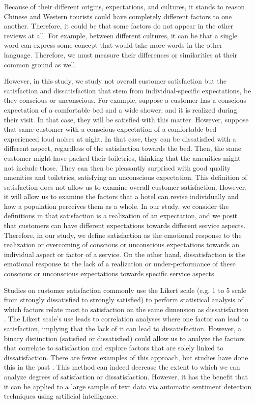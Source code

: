 \documentclass[smallextended,natbib]{svjour3}       %
\begin{document}
    Because of their different origins, expectations, and cultures, it stands to reason Chinese and Western tourists could have completely different factors to one another. Therefore, it could be that some factors do not appear in the other reviews at all. For example, between different cultures, it can be that a single word can express some concept that would take more words in the other language. Therefore, we must measure their differences or similarities at their common ground as well.

    However, in this study, we study not overall customer satisfaction but the satisfaction and dissatisfaction that stem from individual-specific expectations, be they conscious or unconscious. For example, suppose a customer has a conscious expectation of a comfortable bed and a wide shower, and it is realized during their visit. In that case, they will be satisfied with this matter. However, suppose that same customer with a conscious expectation of a comfortable bed experienced loud noises at night. In that case, they can be dissatisfied with a different aspect, regardless of the satisfaction towards the bed. Then, the same customer might have packed their toiletries, thinking that the amenities might not include those. They can then be pleasantly surprised with good quality amenities and toiletries, satisfying an unconscious expectation. This definition of satisfaction does not allow us to examine overall customer satisfaction. However, it will allow us to examine the factors that a hotel can revise individually and how a population perceives them as a whole. In our study, we consider the definitions in \cite{hunt1975} that satisfaction is a realization of an expectation, and we posit that customers can have different expectations towards different service aspects. Therefore, in our study, we define satisfaction as the emotional response to the realization or overcoming of conscious or unconscious expectations towards an individual aspect or factor of a service. On the other hand, dissatisfaction is the emotional response to the lack of a realization or under-performance of these conscious or unconscious expectations towards specific service aspects.

    Studies on customer satisfaction \cite[e.g.][]{truong2009, romao2014, wu2009} commonly use the Likert scale \cite[][]{likert1932technique} (e.g. 1 to 5 scale from strongly dissatisfied to strongly satisfied) to perform statistical analysis of which factors relate most to satisfaction on the same dimension as dissatisfaction \cite[e.g.][]{chan201518, choi2000}. The Likert scale's use leads to correlation analyses where one factor can lead to satisfaction, implying that the lack of it can lead to dissatisfaction. However, a binary distinction (satisfied or dissatisfied) could allow us to analyze the factors that correlate to satisfaction and explore factors that are solely linked to dissatisfaction. There are fewer examples of this approach, but studies have done this in the past \cite[e.g.][]{zhou2014}. This method can indeed decrease the extent to which we can analyze degrees of satisfaction or dissatisfaction. However, it has the benefit that it can be applied to a large sample of text data via automatic sentiment detection techniques using artificial intelligence. 
\end{document}
